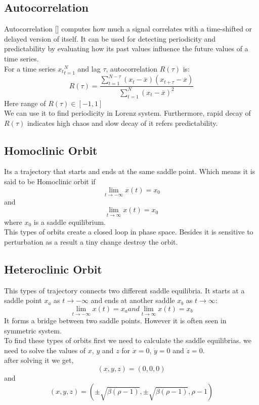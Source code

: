 \documentclass[%
reprint,
amsmath,amssymb,
aps,
floatfix,
]{revtex4-2}
\begin{document}
	\subsection{Autocorrelation}
	Autocorrelation [] computes how much a signal correlates with a time-shifted or delayed version of  itself. It can be used for detecting periodicity and predictability by evaluating how its past values influence the future values of a time series.\\
	For a time series ${x_t}_{t=1}^N$ and lag $\tau$, autocorrelation $R(\tau)$ is:
	\begin{equation}
		R(\tau) = \frac{\sum_{t=1}^{N-\tau} (x_t - \overline{x}) (x_{t+\tau} - \overline{x})}{\sum_{t=1}^{N} (x_t - \overline{x})^2}
	\end{equation}
	Here range of $R(\tau) \in [-1,1]$ \\
	We can use it to find periodicity in Lorenz system. Furthermore, rapid decay of $R(\tau)$ indicates high chaos and slow decay of it refers predictability.\\
	\subsection{Homoclinic Orbit}
	Its a trajectory that starts and ends at the same saddle point.
	Which means it is said to be Homoclinic orbit if\\
	\begin{equation}
		\lim_{t\to -\infty} x(t) = x_0
	\end{equation}
	and
	\begin{equation}
		\lim_{t\to \infty} x(t) = x_0
	\end{equation}
	where $x_0$ is a saddle equilibrium.\\
	This types of orbits create a closed loop in phase space. Besides it is sensitive to perturbation as a result a tiny change destroy the orbit.
	\subsection{Heteroclinic Orbit}
	This types of trajectory connects two different saddle equilibria. It starts at a saddle point $x_a$ as $t\to-\infty$ and ends at another saddle $x_b$ as $t\to\infty$:
	\begin{equation}
		\lim_{t\to-\infty}x(t)= x_a	  and   \lim_{t\to\infty}x(t)= x_b
	\end{equation}
	It forms a bridge between two saddle points. However it is often seen in symmetric system.\\
	To find these types of orbits first we need to calculate the saddle equilibrias. we need to solve the values of $x$, $y$ and $z$ for $\dot{x}=0$, $\dot{y}=0$ and $\dot{z}=0$.\\
	after solving it we get,\\
	\begin{equation}
		(x,y,z) = (0,0,0)
	\end{equation}
	and
	\begin{equation}
		(x,y,z) = (\pm \sqrt{\beta(\rho -1)}, \pm \sqrt{\beta(\rho -1)}, \rho -1)
	\end{equation}
	
\end{document}
